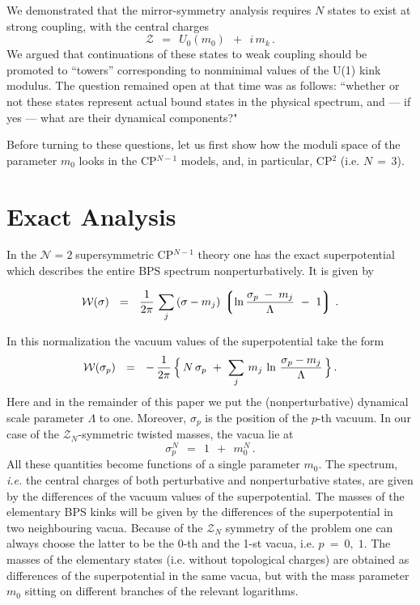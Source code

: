 \documentclass[epsfig,12pt]{article}
\def\beq{\begin{equation}}
\def\eeq{\end{equation}}
\newcommand{\ntwo}{${\mathcal N}=2\;$}
\def\beq{\begin{equation}}
\def\eeq{\end{equation}}
\newcommand{\mc}[1]{\mathcal{#1}}
\newcommand{\lgr}{\left\lgroup}
\newcommand{\rgr}{\right\rgroup}
\newcommand{\W}{\mathcal{W}}
\begin{document}
	We demonstrated that the mirror-symmetry analysis requires $ N $ states to exist at strong coupling,
	with  the 
	central charges
\beq
\label{Usp}
	\mc{Z}  ~~=~~  U_0(m_0)  ~~+~~  i\,m_k\,.
\eeq
	We argued that continuations of these states to  weak coupling should be promoted to ``towers''
	corresponding to nonminimal values of the U(1) kink modulus.
	The question remained open at that time was as follows: ``whether or not these states represent
	actual bound states in the physical spectrum, and --- if yes --- what are their dynamical components?"

	Before turning to these questions,  let us first show how the moduli space of the parameter
	$ m_0 $ looks   in the CP$^{N-1}$ models, and, in particular, CP$^2$ (i.e. $ N \,=\, 3 $). 



\section{Exact Analysis}
\setcounter{equation}{0}
\label{exact}

	In the \ntwo supersymmetric CP$^{N-1}$ theory one has the exact superpotential which
	describes the entire BPS  spectrum nonperturbatively. It is given by \cite{W93,AdDVecSal,ChVa,HaHo}
	
\beq
	\W (\sigma) ~~=~~ \frac{1}{2\pi}\,
	\sum_j\,(\sigma - m_j)\, \lgr \ln \frac{\sigma_p \;-\; m_j}{\Lambda} ~-~ 1  \rgr\,.
\eeq


In this  normalization the vacuum values of the superpotential take 
	the form
\beq
\label{Wvac}
	\W ( \sigma_p ) ~~=~~ 
		-\, \frac{1}{2\pi}\,  
                \Bigl\{\, N\, \sigma_p ~+~ \sum_j\, m_j\, \ln \,\frac{\sigma_p - m_j}{\Lambda} \,\Bigr\}\,.
\eeq
	Here and in the remainder of this   paper we put the (nonperturbative) dynamical scale parameter $ \Lambda $ to one.
	Moreover, $ \sigma_p $ is   the position of the $p$-th vacuum.
	In our case of the $ \mc{Z}_N $-symmetric twisted masses, the vacua lie at
\beq
\label{sig}
	\sigma_p^N  ~~=~~ 1 ~~+~~ m_0^N \,.
\eeq
	All these quantities become functions of a single parameter $ m_0 $.
	The spectrum, {\it i.e.} the central charges of both perturbative and nonperturbative states,
	are given by the differences of the vacuum values of the superpotential.
	The masses of the elementary BPS kinks will be given by the differences of the superpotential in
	two neighbouring vacua.
	Because of the $ \mc{Z}_N $ symmetry of the problem one can always choose the latter to be 
	the 0-th and the 1-st vacua,  i.e. $ p ~=~ 0,\; 1 $.
	The masses of the elementary states (i.e. without topological charges) are obtained as differences of the superpotential in the
	same vacua, but with the mass parameter $ m_0 $ sitting on different branches of 
	the relevant logarithms.
\end{document}
